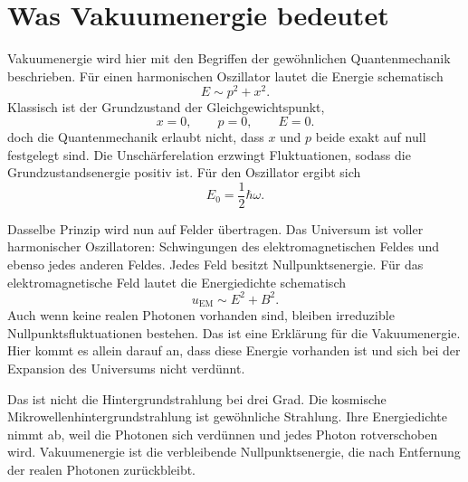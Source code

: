 \section{Was Vakuumenergie bedeutet}

Vakuumenergie wird hier mit den Begriffen der gewöhnlichen Quantenmechanik beschrieben. Für einen harmonischen Oszillator lautet die Energie schematisch
\begin{equation}
E\sim p^2+x^2.
\end{equation}
Klassisch ist der Grundzustand der Gleichgewichtspunkt,
\begin{equation}
x=0,\qquad p=0,\qquad E=0.
\end{equation}
doch die Quantenmechanik erlaubt nicht, dass \(x\) und \(p\) beide exakt auf null festgelegt sind. Die Unschärferelation erzwingt Fluktuationen, sodass die Grundzustandsenergie positiv ist. Für den Oszillator ergibt sich
\begin{equation}
E_0=\frac{1}{2}\hbar\omega.
\end{equation}

Dasselbe Prinzip wird nun auf Felder übertragen. Das Universum ist voller harmonischer Oszillatoren: Schwingungen des elektromagnetischen Feldes und ebenso jedes anderen Feldes. Jedes Feld besitzt Nullpunktsenergie. Für das elektromagnetische Feld lautet die Energiedichte schematisch
\begin{equation}
u_{\mathrm{EM}}\sim E^2+B^2.
\end{equation}
Auch wenn keine realen Photonen vorhanden sind, bleiben irreduzible Nullpunktsfluktuationen bestehen. Das ist eine Erklärung für die Vakuumenergie. Hier kommt es allein darauf an, dass diese Energie vorhanden ist und sich bei der Expansion des Universums nicht verdünnt.

\begin{classroomqa}
\end{classroomqa}

Das ist nicht die Hintergrundstrahlung bei drei Grad. Die kosmische Mikrowellenhintergrundstrahlung ist gewöhnliche Strahlung. Ihre Energiedichte nimmt ab, weil die Photonen sich verdünnen und jedes Photon rotverschoben wird. Vakuumenergie ist die verbleibende Nullpunktsenergie, die nach Entfernung der realen Photonen zurückbleibt.


